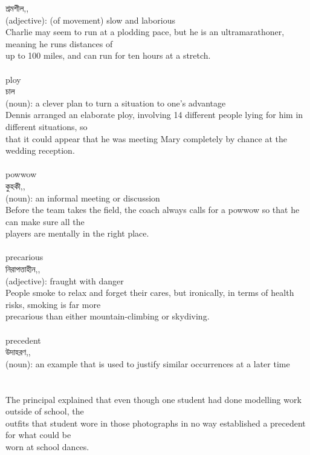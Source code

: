 \documentclass{article}
\begin{document}
{শ্রমশীল,,}\\
{(adjective): (of movement) slow and laborious\\Charlie may seem to run at a plodding pace, but he is an ultramarathoner, meaning he runs distances of\\up to 100 miles, and can run for ten hours at a stretch.\\}\\
{ploy}\\
{চাল}\\
{(noun): a clever plan to turn a situation to one's advantage\\Dennis arranged an elaborate ploy, involving 14 different people lying for him in different situations, so\\that it could appear that he was meeting Mary completely by chance at the wedding reception.\\}\\
{powwow}\\
{কুহকী,,}\\
{(noun): an informal meeting or discussion\\Before the team takes the field, the coach always calls for a powwow so that he can make sure all the\\players are mentally in the right place.\\}\\
{precarious}\\
{নিরাপত্তাহীন,,}\\
{(adjective): fraught with danger\\People smoke to relax and forget their cares, but ironically, in terms of health risks, smoking is far more\\precarious than either mountain-climbing or skydiving.\\}\\
{precedent}\\
{উদাহরণ,,}\\
{(noun): an example that is used to justify similar occurrences at a later time\\\\                                                                               \\The principal explained that even though one student had done modelling work outside of school, the\\outfits that student wore in those photographs in no way established a precedent for what could be\\worn at school dances.\\}\\
\end{document}
